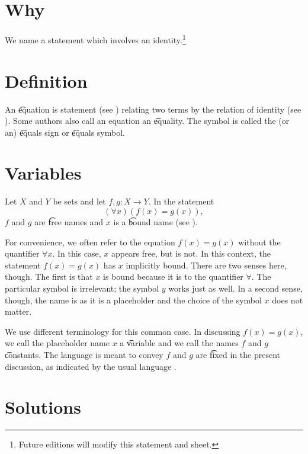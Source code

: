 

\section*{Why}

We name a statement which involves an identity.\footnote{Future editions will modify this statement and sheet.}

\section*{Definition}

An \t{equation} is statement (see ) relating two terms by the relation of identity (see ).
Some authors also call an equation an \t{equality}.
The symbol \say{$=$} is called the (or an) \t{equals sign} or \t{equals symbol}.

\section*{Variables}

Let $X$ and $Y$ be sets and let $f,g: X \to Y$.
In the statement
    \[
(\forall x)(f(x) = g(x)),
    \]
$f$ and $g$ are \t{free} names and $x$ is a \t{bound} name (see ).

For convenience, we often refer to the equation $f(x) = g(x)$ without the quantifier $\forall x$.
In this case, $x$ appears free, but is not.
In this context, the statement $f(x) = g(x)$ has $x$ implicitly bound.
There are two senses here, though.
The first is that $x$ is bound because it is  to the quantifier $\forall$.
The particular symbol is irrelevant; the symbol $y$ works just as well.
In a second sense, though, the name is  as it is a placeholder and the choice of the symbol $x$ does not matter.

We use different terminology for this common case.
In discussing $f(x) = g(x)$, we call the placeholder name $x$ a \t{variable} and we call the names $f$ and $g$ \t{constants}.
The language is meant to convey $f$ and $g$ are \t{fixed} in the present discussion, as indicated by the usual language .

\section*{Solutions}

